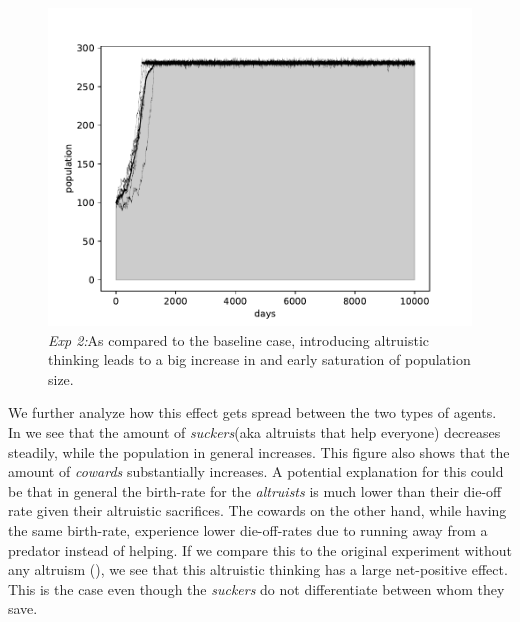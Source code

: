 \documentclass[sigconf]{acmart}
\newcommand{\todo}[1]{{\color{red}{#1}}}
\newcommand{\cowards}{\textit{cowards}\xspace}
\newcommand{\altruists}{\textit{altruists}\xspace}
\newcommand{\suckers}{\textit{suckers}\xspace}
\begin{document}
    \begin{figure}
        \includegraphics[width=\columnwidth]{figures/exp2_total}
        \caption{\textit{Exp 2:}As compared to the baseline case, introducing altruistic thinking leads to a big increase in and early saturation of population size.
        }
        \label{fig:alt_cow_total}
    \end{figure}

    We further analyze how this effect gets spread between the two types of agents.
    In  we see that the amount of \suckers (aka altruists that help everyone) decreases steadily, while the population in general increases.
    This figure also shows that the amount of \cowards substantially increases.
    A potential explanation for this could be that in general the birth-rate for the \altruists is much lower than their die-off rate given their altruistic sacrifices.
    The cowards on the other hand, while having the same birth-rate, experience lower die-off-rates due to running away from a predator instead of helping.
    If we compare this to the original experiment without any altruism (), we see that this altruistic thinking has a large net-positive effect.
    This is the case even though the \suckers do not differentiate between whom they save.
\end{document}
